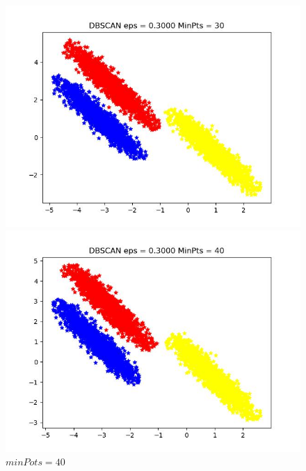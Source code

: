 \documentclass[UTF8]{ctexart}
\begin{document}
\begin{figure}[H]
\begin{minipage}{0.32\linewidth}
		\caption{$minPots=20$}
		\label{chutian2}%
	\end{minipage}
  \begin{minipage}{0.32\linewidth}
		\centering
		\includegraphics[width=0.9\linewidth]{data3-30.jpg}
		\caption{$minPots=30$}
		\label{chutian1}%
	\end{minipage}
	\begin{minipage}{0.32\linewidth}
		\centering
		\includegraphics[width=0.9\linewidth]{data3-40.jpg}
		\caption{$minPots=40$}
		\label{chutian2}%
	\end{minipage}
  \begin{minipage}{0.32\linewidth}
		\centering

\end{minipage}
\end{figure}
\end{document}
